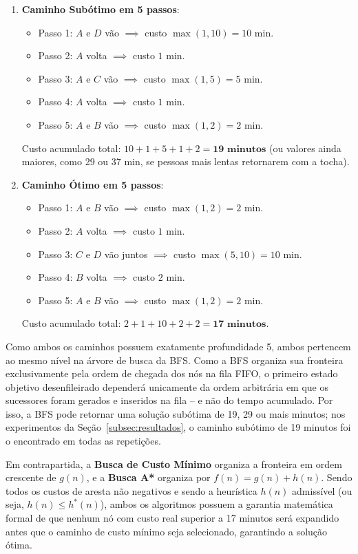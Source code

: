 \begin{enumerate}
	\item \textbf{Caminho Subótimo em 5 passos}:
	      \begin{itemize}
		      \item Passo 1: $A$ e $D$ vão $\implies$ custo $\max(1, 10) = 10\text{ min}$.
		      \item Passo 2: $A$ volta $\implies$ custo $1\text{ min}$.
		      \item Passo 3: $A$ e $C$ vão $\implies$ custo $\max(1, 5) = 5\text{ min}$.
		      \item Passo 4: $A$ volta $\implies$ custo $1\text{ min}$.
		      \item Passo 5: $A$ e $B$ vão $\implies$ custo $\max(1, 2) = 2\text{ min}$.
	      \end{itemize}
	      Custo acumulado total: $10 + 1 + 5 + 1 + 2 = \mathbf{19\text{ minutos}}$ (ou valores ainda maiores, como 29 ou 37 min, se pessoas mais lentas retornarem com a tocha).

	\item \textbf{Caminho Ótimo em 5 passos}:
	      \begin{itemize}
		      \item Passo 1: $A$ e $B$ vão $\implies$ custo $\max(1, 2) = 2\text{ min}$.
		      \item Passo 2: $A$ volta $\implies$ custo $1\text{ min}$.
		      \item Passo 3: $C$ e $D$ vão juntos $\implies$ custo $\max(5, 10) = 10\text{ min}$.
		      \item Passo 4: $B$ volta $\implies$ custo $2\text{ min}$.
		      \item Passo 5: $A$ e $B$ vão $\implies$ custo $\max(1, 2) = 2\text{ min}$.
	      \end{itemize}
	      Custo acumulado total: $2 + 1 + 10 + 2 + 2 = \mathbf{17\text{ minutos}}$.
\end{enumerate}

Como ambos os caminhos possuem exatamente profundidade 5, ambos pertencem ao mesmo nível na árvore de busca da BFS. Como a BFS organiza sua fronteira exclusivamente pela ordem de chegada dos nós na fila FIFO, o primeiro estado objetivo desenfileirado dependerá unicamente da ordem arbitrária em que os sucessores foram gerados e inseridos na fila -- e não do tempo acumulado. Por isso, a BFS pode retornar uma solução subótima de 19, 29 ou mais minutos; nos experimentos da Seção~\ref{subsec:resultados}, o caminho subótimo de 19 minutos foi o encontrado em todas as repetições.

Em contrapartida, a \textbf{Busca de Custo Mínimo} organiza a fronteira em ordem crescente de $g(n)$, e a \textbf{Busca A*} organiza por $f(n) = g(n) + h(n)$. Sendo todos os custos de aresta não negativos e sendo a heurística $h(n)$ admissível (ou seja, $h(n) \leq h^*(n)$), ambos os algoritmos possuem a garantia matemática formal de que nenhum nó com custo real superior a 17 minutos será expandido antes que o caminho de custo mínimo seja selecionado, garantindo a solução ótima.
